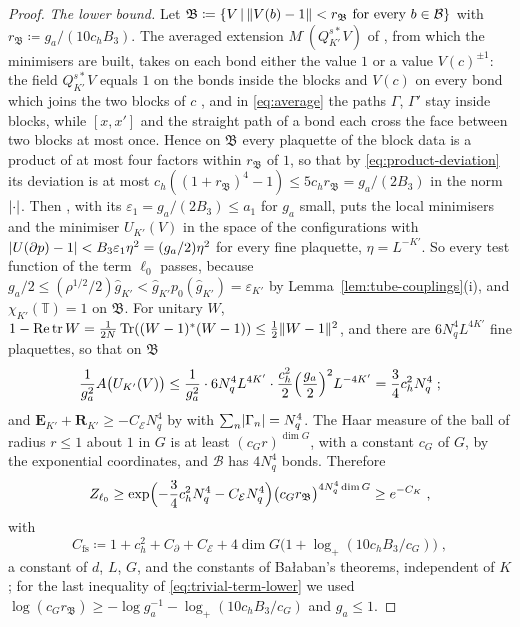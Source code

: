 \documentclass[11pt]{preprint}
\newcommand{\tr}{\operatorname{tr}}
\DeclarePairedDelimiter{\abs}{\lvert}{\rvert}
\DeclarePairedDelimiter{\norm}{\lVert}{\rVert}
\numberwithin{equation}{section}
\theoremstyle{definition}
\theoremstyle{remark}
\theoremstyle{plain}
\begin{document}
\begin{proof}
\emph{The lower bound.} Let $\mathfrak B \coloneqq \{ V \,|\, \norm{V(b) - 1} < r_{\mathfrak B} \text{ for every } b \in \mathcal B \}$ with $r_{\mathfrak B} \coloneqq g_a/(10c_hB_3)$. The averaged extension $M^{\cdot}(Q^{s*}_{K'}V)$ of \cite[(2.16), p.~257]{BalabanCRE}, from which the minimisers are built, takes on each bond either the value $1$ or a value $V(c)^{\pm1}$: the field $Q^{s*}_{K'}V$ equals $1$ on the bonds inside the blocks and $V(c)$ on every bond which joins the two blocks of $c$ \cite[(1.3), p.~246]{BalabanCRE}, and in \eqref{eq:average} the paths $\Gamma$, $\Gamma'$ stay inside blocks, while $[x, x']$ and the straight path of a bond each cross the face between two blocks at most once. Hence on $\mathfrak B$ every plaquette of the block data is a product of at most four factors within $r_{\mathfrak B}$ of $1$, so that by \eqref{eq:product-deviation} its deviation is at most $c_h((1 + r_{\mathfrak B})^4 - 1) \leq 5c_hr_{\mathfrak B} = g_a/(2B_3)$ in the norm $\abs{\cdot}$. Then \cite[Theorem~1, p.~279]{BalabanVAR}, with its $\varepsilon_1 = g_a/(2B_3) \leq a_1$ for $g_a$ small, puts the local minimisers and the minimiser $U_{K'}(V)$ in the space of the configurations with $\abs{U(\partial p) - 1} < B_3\varepsilon_1\eta^2 = (g_a/2)\eta^2$ for every fine plaquette, $\eta = L^{-K'}$. So every test function of the term $\ell_0$ passes, because $g_a/2 \leq (\rho^{1/2}/2)\hat g_{K'} < \hat g_{K'}p_0(\hat g_{K'}) = \varepsilon_{K'}$ by Lemma~\ref{lem:tube-couplings}(i), and $\chi_{K'}(\mathbb T) = 1$ on $\mathfrak B$. For unitary $W$, $1 - \operatorname{Re}\tr W = \frac{1}{2N}\operatorname{Tr}((W - 1)^*(W - 1)) \leq \frac12\norm{W - 1}^2$, and there are $6N_q^4L^{4K'}$ fine plaquettes, so that on $\mathfrak B$
\begin{equation}\label{eq:trivial-term-action}
    \frac{1}{g_a^2}A\bigl(U_{K'}(V)\bigr) \leq \frac{1}{g_a^2}\cdot6N_q^4L^{4K'}\cdot\frac{c_h^2}{2}\Bigl(\frac{g_a}{2}\Bigr)^2L^{-4K'} = \frac34c_h^2N_q^4\;;
\end{equation}
and $\mathbf E_{K'} + \mathbf R_{K'} \geq -C_{\mathcal E}N_q^4$ by \cite[(2.45), (2.46)]{BalabanCRE} with $\sum_n\abs{\Gamma_n} = N_q^4$. The Haar measure of the ball of radius $r \leq 1$ about $1$ in $G$ is at least $(c_Gr)^{\dim G}$, with a constant $c_G$ of $G$, by the exponential coordinates, and $\mathcal B$ has $4N_q^4$ bonds. Therefore
\begin{equation}\label{eq:trivial-term-lower}
    Z_{\ell_0} \geq \exp\Bigl(-\frac34c_h^2N_q^4 - C_{\mathcal E}N_q^4\Bigr)\bigl(c_Gr_{\mathfrak B}\bigr)^{4N_q^4\dim G} \geq e^{-C_K}\;,
\end{equation}
with
\begin{equation}\label{eq:final-scale-constant}
    C_{\mathrm{fs}} \coloneqq 1 + c_h^2 + C_\partial + C_{\mathcal E} + 4\dim G\bigl(1 + \log_+(10c_hB_3/c_G)\bigr)\;,
\end{equation}
a constant of $d$, $L$, $G$, and the constants of Ba{\l}aban's theorems, independent of $K$; for the last inequality of \eqref{eq:trivial-term-lower} we used $\log(c_Gr_{\mathfrak B}) \geq -\log g_a^{-1} - \log_+(10c_hB_3/c_G)$ and $g_a \leq 1$.


\end{proof}
\end{document}
